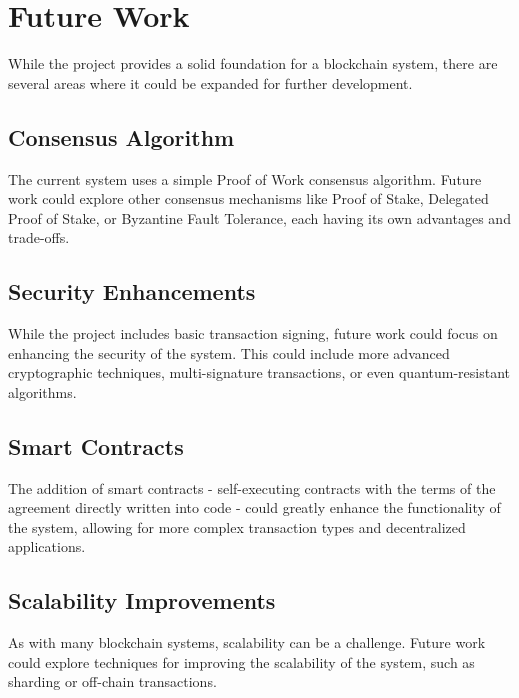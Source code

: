 \documentclass{article}
\begin{document}
\section{Future Work}
While the project provides a solid foundation for a blockchain system, there are several areas where it could be expanded for further development.

\subsection{Consensus Algorithm}
The current system uses a simple Proof of Work consensus algorithm. Future work could explore other consensus mechanisms like Proof of Stake, Delegated Proof of Stake, or Byzantine Fault Tolerance, each having its own advantages and trade-offs.

\subsection{Security Enhancements}
While the project includes basic transaction signing, future work could focus on enhancing the security of the system. This could include more advanced cryptographic techniques, multi-signature transactions, or even quantum-resistant algorithms.

\subsection{Smart Contracts}
The addition of smart contracts - self-executing contracts with the terms of the agreement directly written into code - could greatly enhance the functionality of the system, allowing for more complex transaction types and decentralized applications.

\subsection{Scalability Improvements}
As with many blockchain systems, scalability can be a challenge. Future work could explore techniques for improving the scalability of the system, such as sharding or off-chain transactions.
\end{document}
